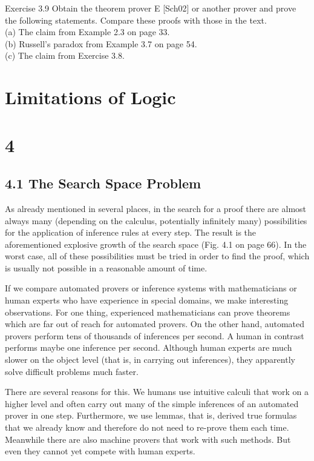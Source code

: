 \documentclass[10pt]{article}
\begin{document}
Exercise 3.9 Obtain the theorem prover E [Sch02] or another prover and prove the following statements. Compare these proofs with those in the text.\\
(a) The claim from Example 2.3 on page 33.\\
(b) Russell's paradox from Example 3.7 on page 54.\\
(c) The claim from Exercise 3.8.

\section*{Limitations of Logic}
\section*{4}
\subsection*{4.1 The Search Space Problem}
As already mentioned in several places, in the search for a proof there are almost always many (depending on the calculus, potentially infinitely many) possibilities for the application of inference rules at every step. The result is the aforementioned explosive growth of the search space (Fig. 4.1 on page 66). In the worst case, all of these possibilities must be tried in order to find the proof, which is usually not possible in a reasonable amount of time.

If we compare automated provers or inference systems with mathematicians or human experts who have experience in special domains, we make interesting observations. For one thing, experienced mathematicians can prove theorems which are far out of reach for automated provers. On the other hand, automated provers perform tens of thousands of inferences per second. A human in contrast performs maybe one inference per second. Although human experts are much slower on the object level (that is, in carrying out inferences), they apparently solve difficult problems much faster.

There are several reasons for this. We humans use intuitive calculi that work on a higher level and often carry out many of the simple inferences of an automated prover in one step. Furthermore, we use lemmas, that is, derived true formulas that we already know and therefore do not need to re-prove them each time. Meanwhile there are also machine provers that work with such methods. But even they cannot yet compete with human experts.
\end{document}
